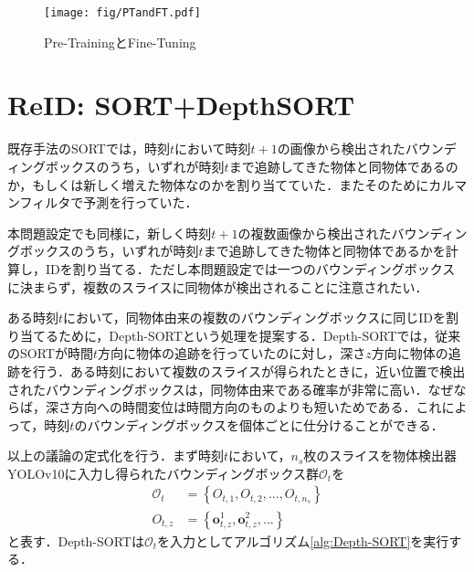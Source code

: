 \begin{figure}[t]
    \centering    
    \texttt{[image: fig/PTandFT.pdf]}
    \caption{Pre-TrainingとFine-Tuning}
    \label{fig:PTandFT}
\end{figure}

\section{ReID: SORT+DepthSORT}
既存手法のSORTでは，時刻$t$において時刻$t+1$の画像から検出されたバウンディングボックスのうち，いずれが時刻$t$まで追跡してきた物体と同物体であるのか，もしくは新しく増えた物体なのかを割り当てていた．またそのためにカルマンフィルタで予測を行っていた．
\par
本問題設定でも同様に，新しく時刻$t+1$の複数画像から検出されたバウンディングボックスのうち，いずれが時刻$t$まで追跡してきた物体と同物体であるかを計算し，IDを割り当てる．ただし本問題設定では一つのバウンディングボックスに決まらず，複数のスライスに同物体が検出されることに注意されたい．
\par
ある時刻$t$において，同物体由来の複数のバウンディングボックスに同じIDを割り当てるために，Depth-SORTという処理を提案する．Depth-SORTでは，従来のSORTが時間$t$方向に物体の追跡を行っていたのに対し，深さ$z$方向に物体の追跡を行う．ある時刻において複数のスライスが得られたときに，近い位置で検出されたバウンディングボックスは，同物体由来である確率が非常に高い．なぜならば，深さ方向への時間変位は時間方向のものよりも短いためである．これによって，時刻$t$のバウンディングボックスを個体ごとに仕分けることができる．
\par
以上の議論の定式化を行う．まず時刻$t$において，$n_s$枚のスライスを物体検出器YOLOv10に入力し得られたバウンディングボックス群$\mathcal{O}_t$を
\begin{equation}
    \begin{aligned}
        \mathcal{O}_t &= \left\{O_{t, 1}, O_{t,2},...,O_{t,n_s}\right\}
        \\ O_{t,z} &= \left\{\bm{o}_{t,z}^1, \bm{o}_{t,z}^2,...\right\}
    \end{aligned}
\end{equation}
と表す．Depth-SORTは$\mathcal{O}_t$を入力としてアルゴリズム\ref{alg:Depth-SORT}を実行する．
